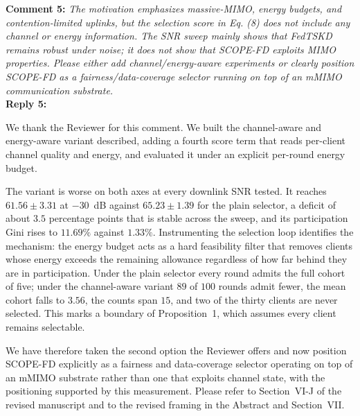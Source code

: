 \documentclass[10pt]{article}
\begin{document}
\noindent
\textbf{Comment 5:} \textit{The motivation emphasizes massive-MIMO, energy budgets, and contention-limited uplinks, but the selection score in Eq. (8) does not include any channel or energy information. The SNR sweep mainly shows that FedTSKD remains robust under noise; it does not show that SCOPE-FD exploits MIMO properties. Please either add channel/energy-aware experiments or clearly position SCOPE-FD as a fairness/data-coverage selector running on top of an mMIMO communication substrate.} \\
\noindent
\textbf{Reply 5:} {We thank the Reviewer for this comment. We built the channel-aware and energy-aware variant described, adding a fourth score term that reads per-client channel quality and energy, and evaluated it under an explicit per-round energy budget.

The variant is worse on both axes at every downlink SNR tested. It reaches $61.56 \pm 3.31$ at $-30$~dB against $65.23 \pm 1.39$ for the plain selector, a deficit of about $3.5$ percentage points that is stable across the sweep, and its participation Gini rises to $11.69\%$ against $1.33\%$. Instrumenting the selection loop identifies the mechanism: the energy budget acts as a hard feasibility filter that removes clients whose energy exceeds the remaining allowance regardless of how far behind they are in participation. Under the plain selector every round admits the full cohort of five; under the channel-aware variant $89$ of $100$ rounds admit fewer, the mean cohort falls to $3.56$, the counts span $15$, and two of the thirty clients are never selected. This marks a boundary of Proposition~1, which assumes every client remains selectable.

We have therefore taken the second option the Reviewer offers and now position SCOPE-FD explicitly as a fairness and data-coverage selector operating on top of an mMIMO substrate rather than one that exploits channel state, with the positioning supported by this measurement. Please refer to Section~VI-J of the revised manuscript and to the revised framing in the Abstract and Section~VII.}\\
\end{document}
